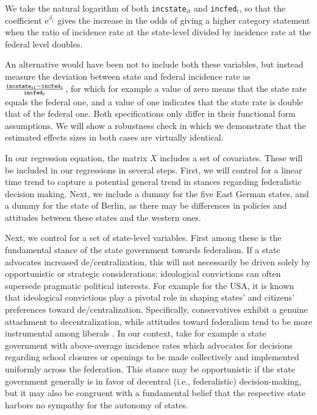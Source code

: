 \documentclass[authoryear,12pt, 3p]{elsarticle} %
\theoremstyle{break}
\begin{document}
We take the natural logarithm of both \texttt{incstate}$_{it}$ and \texttt{incfed}$_{t}$, so that the coefficient $\mathrm{e}^{\beta_1}$ gives the increase in the odds of giving a higher category statement when the ratio of incidence rate at the state-level divided by incidence rate at the federal level doubles.

An alternative would have been not to include both these variables, but instead measure the deviation between state and federal incidence rate as  $\frac{\text{\texttt{incstate}}_{it} - \text{\texttt{incfed}}_{t}}{\text{\texttt{incfed}}_{t}}$, for which for example a value of zero means that the state rate equals the federal one, and a value of one indicates that the state rate is double that of the federal one. Both specifications only differ in their functional form assumptions. We will show a robustness check in which we demonstrate that the estimated effects sizes in both cases are virtually identical.

In our regression equation, the matrix $X$ includes a set of covariates. These will be included in our regressions in several steps. First, we will control for a linear time trend to capture a potential general trend in stances regarding federalistic decision making. Next, we include a dummy for the five East German states, and a dummy for the state of Berlin, as there may be differences in policies and attitudes between these states and the western ones. 

Next, we control for a set of state-level variables. First among these is the fundamental stance of the state government towards federalism. If a state advocates increased de/centralization, this will not necessarily be driven solely by opportunistic or strategic considerations; ideological convictions can often supersede pragmatic political interests. For example for the USA, it is known that ideological convictions play a pivotal role in shaping states' and citizens' preferences toward de/centralization. Specifically, conservatives exhibit a genuine attachment to decentralization, while attitudes toward federalism tend to be more instrumental among liberals \citep{Glaser2023, Rendleman2022}. In our context, take for example a state government with above-average incidence rates which advocates for decisions regarding school closures or openings to be made collectively and implemented uniformly across the federation. This stance may be opportunistic if the state government generally is in favor of decentral (i.e., federalistic) decision-making, but it may also be congruent with a fundamental belief that the respective state harbors no sympathy for the autonomy of states.
\end{document}
